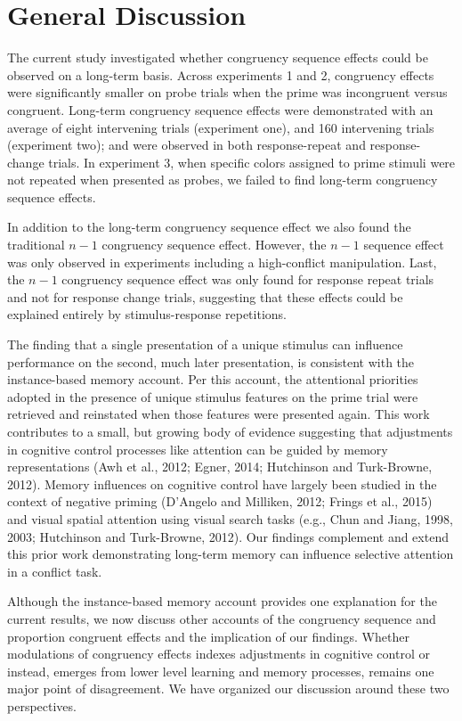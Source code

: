 \documentclass[]{DissertateCUNY}
\begin{document}
\hypertarget{general-discussion-1}{%
\section{General Discussion}\label{general-discussion-1}}

The current study investigated whether congruency sequence effects could
be observed on a long-term basis. Across experiments 1 and 2, congruency
effects were significantly smaller on probe trials when the prime was
incongruent versus congruent. Long-term congruency sequence effects were
demonstrated with an average of eight intervening trials (experiment
one), and 160 intervening trials (experiment two); and were observed in
both response-repeat and response-change trials. In experiment 3, when
specific colors assigned to prime stimuli were not repeated when
presented as probes, we failed to find long-term congruency sequence
effects.

In addition to the long-term congruency sequence effect we also found
the traditional \(n-1\) congruency sequence effect. However, the \(n-1\)
sequence effect was only observed in experiments including a
high-conflict manipulation. Last, the \(n-1\) congruency sequence effect
was only found for response repeat trials and not for response change
trials, suggesting that these effects could be explained entirely by
stimulus-response repetitions.

The finding that a single presentation of a unique stimulus can
influence performance on the second, much later presentation, is
consistent with the instance-based memory account. Per this account, the
attentional priorities adopted in the presence of unique stimulus
features on the prime trial were retrieved and reinstated when those
features were presented again. This work contributes to a small, but
growing body of evidence suggesting that adjustments in cognitive
control processes like attention can be guided by memory representations
(Awh et al., 2012; Egner, 2014; Hutchinson and Turk-Browne, 2012).
Memory influences on cognitive control have largely been studied in the
context of negative priming (D'Angelo and Milliken, 2012; Frings et al.,
2015) and visual spatial attention using visual search tasks (e.g., Chun
and Jiang, 1998, 2003; Hutchinson and Turk-Browne, 2012). Our findings
complement and extend this prior work demonstrating long-term memory can
influence selective attention in a conflict task.

Although the instance-based memory account provides one explanation for
the current results, we now discuss other accounts of the congruency
sequence and proportion congruent effects and the implication of our
findings. Whether modulations of congruency effects indexes adjustments
in cognitive control or instead, emerges from lower level learning and
memory processes, remains one major point of disagreement. We have
organized our discussion around these two perspectives.
\end{document}
